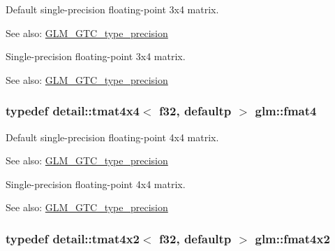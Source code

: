 Default single-precision floating-point 3x4 matrix. \begin{Desc}
\item[See also:]\hyperlink{group__gtc__type__precision}{GLM\_\-GTC\_\-type\_\-precision}\end{Desc}
Single-precision floating-point 3x4 matrix. \begin{Desc}
\item[See also:]\hyperlink{group__gtc__type__precision}{GLM\_\-GTC\_\-type\_\-precision} \end{Desc}
\hypertarget{group__gtc__type__precision_gfbea1649c5384f13ff4595c9d0003a68}{
\subsubsection[fmat4]{\setlength{\rightskip}{0pt plus 5cm}typedef detail::tmat4x4$<$ f32, defaultp $>$ {\bf glm::fmat4}}}
\label{group__gtc__type__precision_gfbea1649c5384f13ff4595c9d0003a68}


Default single-precision floating-point 4x4 matrix. \begin{Desc}
\item[See also:]\hyperlink{group__gtc__type__precision}{GLM\_\-GTC\_\-type\_\-precision}\end{Desc}
Single-precision floating-point 4x4 matrix. \begin{Desc}
\item[See also:]\hyperlink{group__gtc__type__precision}{GLM\_\-GTC\_\-type\_\-precision} \end{Desc}
\hypertarget{group__gtc__type__precision_g0cf4b66f4929b3c21ab7b967386fc7dd}{
\subsubsection[fmat4x2]{\setlength{\rightskip}{0pt plus 5cm}typedef detail::tmat4x2$<$ f32, defaultp $>$ {\bf glm::fmat4x2}}}
\label{group__gtc__type__precision_g0cf4b66f4929b3c21ab7b967386fc7dd}


